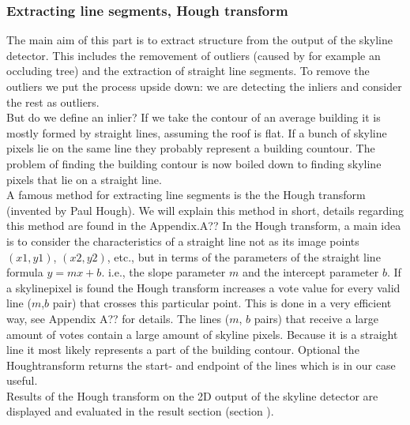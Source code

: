 \subsubsection{Extracting line segments, Hough transform} %

	The main aim of this part is to extract structure from the output of the skyline detector. This includes the removement of outliers (caused by for example an occluding tree) and the extraction of straight line segments. 
	To remove the outliers we put the process upside down: we are detecting the inliers and consider the rest as outliers.\\
	But do we define an inlier? If we take the contour of an average building it is mostly formed by straight lines, assuming the roof is flat.
	If a bunch of skyline pixels lie on the same line they probably represent a building countour.
	The problem of finding the building contour is now boiled down to finding skyline pixels that lie on a straight line.
	\\
	A famous method for extracting line segments is the the Hough transform (invented by Paul Hough).
	We will explain this method in short, details regarding this method are found in the Appendix.A??%
	In the Hough transform, a main idea is to consider the characteristics of a straight line not as its image points $(x1, y1)$, $(x2, y2)$, etc., but in terms of the parameters of the straight line formula $y = mx + b$. i.e., the slope parameter $m$ and the intercept parameter $b$.
	If a skylinepixel is found the Hough transform increases a vote value for every valid line ($m$,$b$ pair) that crosses this particular point. This is done in a very efficient way, see Appendix A?? %
	for details.
	The lines ($m$, $b$ pairs) that receive a large amount of votes contain a large amount of skyline pixels. Because it is a straight line it most likely represents a part of the building contour. 
	Optional the Houghtransform returns the start- and endpoint of the lines which is in our case useful. 
	\\
	Results of the Hough transform on the 2D output of the skyline detector are displayed and evaluated in the result section (section %
	).

